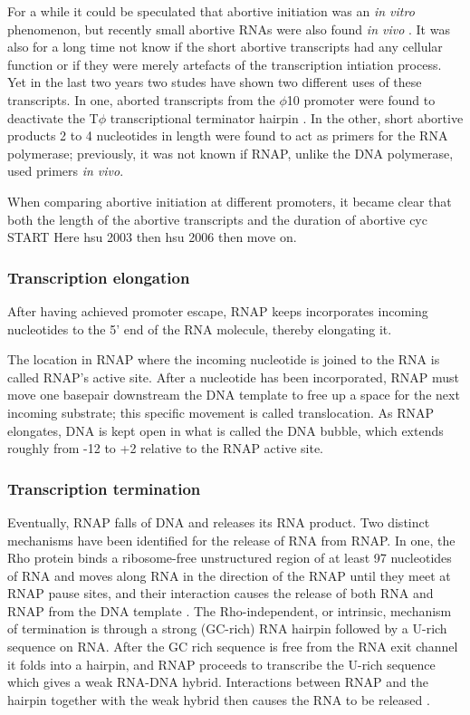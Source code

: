 For a while it could be speculated that abortive initiation was an \textit{in
vitro} phenomenon, but recently small abortive RNAs were also found \textit{in
vivo} \cite{goldman_direct_2009}. It was also for a long time not know if the
short abortive transcripts had any cellular function or if they were merely
artefacts of the transcription intiation process. Yet in the last two years two
studes have shown two different uses of these transcripts. In one, aborted
transcripts from the $\phi$10 promoter were found to deactivate the T$\phi$
transcriptional terminator hairpin \cite{lee_tiny_2010}. In the other, short
abortive products 2 to 4 nucleotides in length were found to act as primers for
the RNA polymerase; previously, it was not known if RNAP, unlike the DNA
polymerase, used primers \textit{in vivo}.

When comparing abortive initiation at different promoters, it became clear that
both the length of the abortive transcripts and the duration of abortive cyc
START Here hsu 2003 then hsu 2006 then move on.

\subsubsection{Transcription elongation}
After having achieved promoter escape, RNAP keeps incorporates incoming
nucleotides to the 5' end of the RNA molecule, thereby elongating it.

The location in RNAP where the incoming nucleotide is joined to the RNA is
called RNAP's active site. After a nucleotide has been incorporated, RNAP must
move one basepair downstream the DNA template to free up a space for the next
incoming substrate; this specific movement is called translocation. As RNAP
elongates, DNA is kept open in what is called the DNA bubble, which extends
roughly from -12 to +2 relative to the RNAP active site.

\subsubsection{Transcription termination}
Eventually, RNAP falls of DNA and releases its RNA product. Two distinct
mechanisms have been identified for the release of RNA from RNAP. In one, the Rho
protein binds a ribosome-free unstructured region of at least 97 nucleotides of
RNA and moves along RNA in the direction of the RNAP until they meet at RNAP
pause sites, and their interaction causes the release of both RNA and RNAP from
the DNA template \cite{ciampi_rho-dependent_2006}. The
Rho-independent, or intrinsic, mechanism of termination is through a strong
(GC-rich) RNA hairpin followed by a U-rich sequence on RNA. After the GC rich
sequence is free from the RNA exit channel it folds into a hairpin, and
RNAP proceeds to transcribe the U-rich sequence which gives a weak RNA-DNA
hybrid. Interactions between RNAP and the hairpin together with the weak hybrid
then causes the RNA to be released \cite{nudler_transcription_2002}.

